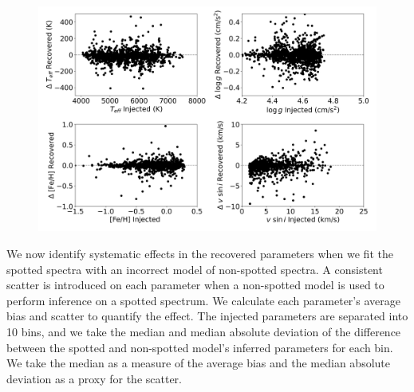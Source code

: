 \begin{figure}
    \includegraphics[width=\textwidth]{Figures/ss_chapter_figures/recov_tests_full.png}
    \caption[The difference between the recovered traditional stellar spectra parameters (\teff{,} \ \logg{,} \ \feh \ and \vsini) from the synthetic spotted spectra fitted with both a spotted and non-spotted model of the stellar spectra against the injected parameters of the synthetic spectra.]{}
    \label{fig:recov_dif}
\end{figure}


We now identify systematic effects in the recovered parameters when we fit the spotted spectra with an incorrect model of non-spotted spectra.  A consistent scatter is introduced on each parameter when a non-spotted model is used to perform inference on a spotted spectrum. We calculate each parameter's average bias and scatter to quantify the effect. The injected parameters are separated into 10 bins, and we take the median and median absolute deviation of the difference between the spotted and non-spotted model's inferred parameters for each bin. We take the median as a measure of the average bias and the median absolute deviation as a proxy for the scatter.

